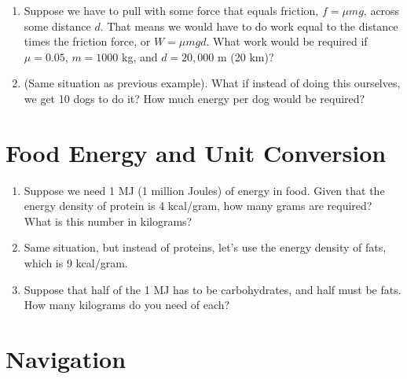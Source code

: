 \documentclass[10pt]{article}
\begin{document}
\begin{enumerate}
\begin{figure}[hb]
\end{figure}
\item Suppose we have to pull with some force that equals friction, $f = \mu m g$, across some distance $d$.  That means we would have to do work equal to the distance times the friction force, or $W = \mu m g d$.  What work would be required if $\mu = 0.05$, $m = 1000$ kg, and $d = 20,000$ m (20 km)? \\ \vspace{3cm}
\item (Same situation as previous example).  What if instead of doing this ourselves, we get 10 dogs to do it?  How much energy per dog would be required? \\ \vspace{2cm}
\end{enumerate}

\section{Food Energy and Unit Conversion}

\begin{enumerate}
\item Suppose we need 1 MJ (1 million Joules) of energy in food.  Given that the energy density of protein is 4 kcal/gram, how many grams are required?  What is this number in kilograms? \\ \vspace{1cm}
\item Same situation, but instead of proteins, let's use the energy density of fats, which is 9 kcal/gram. \\ \vspace{1cm}
\item Suppose that half of the 1 MJ has to be carbohydrates, and half must be fats.  How many kilograms do you need of each? \\ \vspace{1cm}
\end{enumerate}

\section{Navigation}
\end{document}
